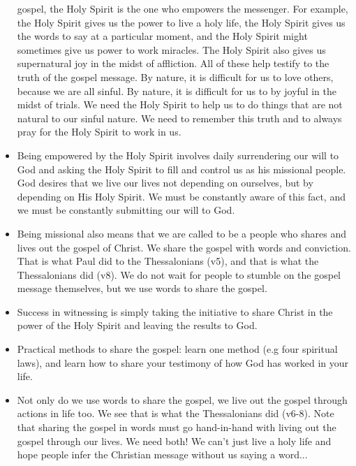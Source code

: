 \begin{itemize}
{  gospel, the Holy Spirit is the one who empowers the messenger.  For
  example, the Holy Spirit gives us the power to live a holy life, the Holy
  Spirit gives us the words to say at a particular moment, and the Holy
  Spirit might sometimes give us power to work miracles.  The Holy Spirit
  also gives us supernatural joy in the midst of affliction.  All of these
  help testify to the truth of the gospel message.  By nature, it is
  difficult for us to love others, because we are all sinful.  By nature, it
  is difficult for us to by joyful in the midst of trials.  We need the Holy
  Spirit to help us to do things that are not natural to our sinful nature.
  We need to remember this truth and to always pray for the Holy Spirit to
  work in us.}
  \item{Being empowered by the Holy Spirit involves daily surrendering our
  will to God and asking the Holy Spirit to fill and control us as his
  missional people.  God desires that we live our lives not depending on
  ourselves, but by depending on His Holy Spirit.  We must be constantly
  aware of this fact, and we must be constantly submitting our will to God.}
  \item{Being missional also means that we are called to be a people who
  shares and lives out the gospel of Christ.  We share the gospel with words
  and conviction.  That is what Paul did to the Thessalonians (v5), and that
  is what the Thessalonians did (v8).  We do not wait for people to stumble
  on the gospel message themselves, but we use words to share the gospel.}
  \item{Success in witnessing is simply taking the initiative to share Christ
  in the power of the Holy Spirit and leaving the results to God.}
  \item{Practical methods to share the gospel: learn one method (e.g four
  spiritual laws), and learn how to share your testimony of how God has
  worked in your life.}
  \item{Not only do we use words to share the gospel, we live out the gospel
  through actions in life too.  We see that is what the Thessalonians did
  (v6-8).  Note that sharing the gospel in words must go hand-in-hand with
  living out the gospel through our lives.  We need both!  We can't just live
  a holy life and hope people infer the Christian message without us saying a
  word...  }
\end{itemize}